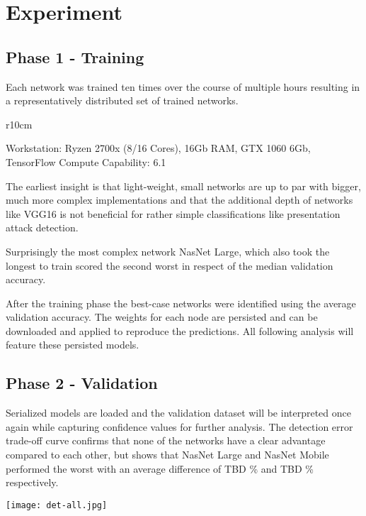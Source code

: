 
\section{Experiment}
\subsection{Phase 1 - Training}

Each network was trained ten times over the course of multiple hours resulting in a representatively distributed set of trained networks.

\begin{wrapfigure}[10]{r}{10cm}
    \vspace{-10mm} 
    
    \vspace{2mm}
    Workstation: Ryzen 2700x (8/16 Cores), 16Gb RAM, GTX 1060 6Gb, TensorFlow Compute Capability: 6.1
\end{wrapfigure}
\smallskip\noindent
The earliest insight is that light-weight, small networks are up to par with bigger, much more complex implementations and that the additional depth of networks like VGG16 is not beneficial for rather simple classifications like presentation attack detection.

\noindent
Surprisingly the most complex network NasNet Large, which also took the longest to train scored the second worst in respect of the median validation accuracy.

\noindent
After the training phase the best-case networks were identified using the average validation accuracy.
The weights for each node are persisted and can be downloaded and applied to reproduce the predictions.
All following analysis will feature these persisted models.


\subsection{Phase 2 - Validation}
Serialized models are loaded and the validation dataset will be interpreted once again while capturing confidence values for further analysis.
The detection error trade-off curve confirms that none of the networks have a clear advantage compared to each other, but shows that NasNet Large and NasNet Mobile performed the worst with an average difference of TBD \% and TBD \% respectively.

\noindent
\begin{minipage}{0.5\textwidth}
    
\end{minipage}%
\begin{minipage}{0.5\textwidth}
    \texttt{[image: det-all.jpg]}
\end{minipage}


